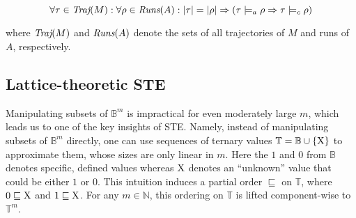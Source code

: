 
\begin{equation*}
\forall \tau \in \operatorname{\textit{Traj}}(M) : \forall \rho \in \operatorname{\textit{Runs}}(A) : | \tau | = | \rho | \Rightarrow (\tau \models_{a} \rho \Rightarrow \tau \models_{c} \rho)
\end{equation*}

\noindent where $\operatorname{\textit{Traj}}(M)$ and $\operatorname{\textit{Runs}}(A)$ denote the sets of all trajectories of $M$ and runs of $A$, respectively.







\subsection{Lattice-theoretic STE}

Manipulating subsets of $\mathbb{B}^{m}$ is impractical for even moderately large $m$, which leads us to one of the key insights of STE. Namely, instead of manipulating subsets of $\mathbb{B}^{m}$ directly, one can use sequences of ternary values $\mathbb{T} = \mathbb{B} \cup \{ \mathrm{X} \} $ to approximate them, whose sizes are only linear in $m$. Here the $1$ and $0$ from $\mathbb{B}$ denotes specific, defined values whereas $\mathrm{X}$ denotes an ``unknown'' value that could be either $1$ or $0$. This intuition induces a partial order $\sqsubseteq$ on $\mathbb{T}$, where $0 \sqsubseteq \mathrm{X}$ and $1 \sqsubseteq \mathrm{X}$\footnotemark. For any $m \in \mathbb{N}$, this ordering on $\mathbb{T}$ is lifted component-wise to $\mathbb{T}^{m}$.

